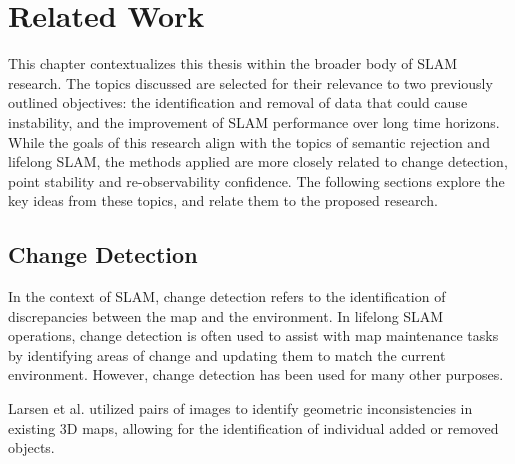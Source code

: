\section{Related Work}
\label{sec:related_work}

This chapter contextualizes this thesis within the broader body of SLAM research. The topics discussed are selected for their relevance to two previously outlined objectives: the identification and removal of data that could cause instability, and the improvement of SLAM performance over long time horizons. While the goals of this research align with the topics of semantic rejection and lifelong SLAM, the methods applied are more closely related to change detection, point stability and re-observability confidence. The following sections explore the key ideas from these topics, and relate them to the proposed research.

\subsection{Change Detection}

In the context of SLAM, change detection refers to the identification of discrepancies between the map and the environment. In lifelong SLAM operations, change detection is often used to assist with map maintenance tasks by identifying areas of change and updating them to match the current environment. However, change detection has been used for many other purposes.

Larsen et al. \cite{larsenChangeDetectionModel} utilized pairs of images to identify geometric inconsistencies in existing 3D maps, allowing for the identification of individual added or removed objects.




